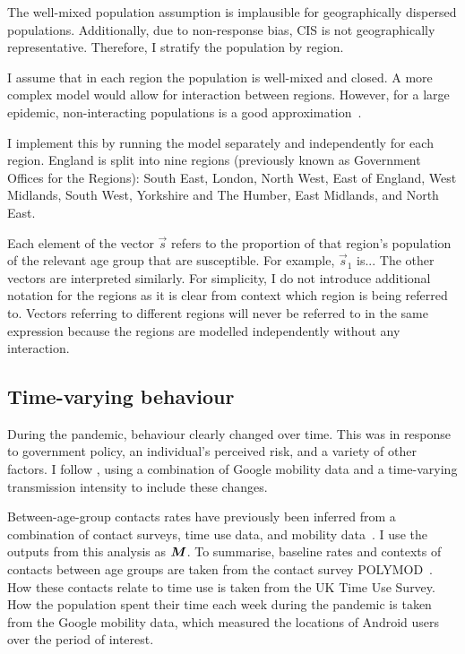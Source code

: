 \documentclass[thesis.tex]{subfiles}
\begin{document}
The well-mixed population assumption is implausible for geographically dispersed populations.
Additionally, due to non-response bias, CIS is not geographically representative.
Therefore, I stratify the population by region.

I assume that in each region the population is well-mixed and closed.
A more complex model would allow for interaction between regions.
However, for a large epidemic, non-interacting populations is a good approximation~\autocite{birrellRealtimea}.

I implement this by running the model separately and independently for each region.
England is split into nine regions (previously known as Government Offices for the Regions): South East, London, North West, East of England, West Midlands, South West, Yorkshire and The Humber, East Midlands, and North East.

Each element of the vector $\vec{s}$ refers to the proportion of that region's population of the relevant age group that are susceptible.
For example, $\vec{s}_1$ is...
The other vectors are interpreted similarly.
For simplicity, I do not introduce additional notation for the regions as it is clear from context which region is being referred to.
Vectors referring to different regions will never be referred to in the same expression because the regions are modelled independently without any interaction.

\subsection{Time-varying behaviour} \label{SEIR:sec:time-varying-foi}

During the pandemic, behaviour clearly changed over time.
This was in response to government policy, an individual's perceived risk, and a variety of other factors.
I follow \textcite{birrellRealtime}, using a combination of Google mobility data and a time-varying transmission intensity to include these changes.

Between-age-group contacts rates have previously been inferred from a combination of contact surveys, time use data, and mobility data~\autocites{vanleeuwenTime}{vanleeuwenAugmenting}.
I use the outputs from this analysis as $\bm{M}$.
To summarise, baseline rates and contexts of contacts between age groups are taken from the contact survey POLYMOD~\autocite{mossongSocial}.
How these contacts relate to time use is taken from the UK Time Use Survey.
How the population spent their time each week during the pandemic is taken from the Google mobility data, which measured the locations of Android users over the period of interest.
\end{document}
